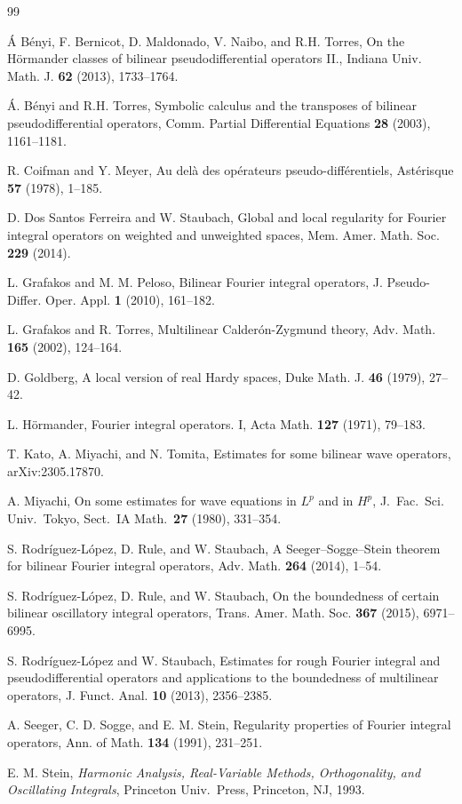 \documentclass[12pt]{amsart}
\numberwithin{equation}{section}
\theoremstyle{plain}
\theoremstyle{definition}
\begin{document}
\begin{thebibliography}{99}

\'A B\'enyi,  F. Bernicot, D. Maldonado, V. Naibo, and R.H. Torres,
On the H\"ormander classes of bilinear pseudodifferential operators II.,
Indiana Univ. Math. J. {\bf 62} (2013), 1733--1764.
	
\'A. B\'enyi and R.H. Torres,
Symbolic calculus and the transposes of bilinear pseudodifferential operators,
Comm. Partial Differential Equations {\bf 28} (2003), 1161--1181. 

R. Coifman and Y. Meyer,
{Au del\`a des op\'erateurs pseudo-diff\'erentiels},
Ast\'erisque {\bf 57} (1978), 1--185.

D. Dos Santos Ferreira and W. Staubach, 
{Global and local regularity for Fourier integral operators on
weighted and unweighted spaces}, 
Mem. Amer. Math. Soc. {\bf 229} (2014).

L. Grafakos and M. M. Peloso, 
Bilinear Fourier integral operators, 
J. Pseudo-Differ. Oper. Appl. {\bf 1} (2010), 161--182.

L. Grafakos and R. Torres,
{Multilinear Calder\'on-Zygmund theory},
Adv. Math. {\bf 165} (2002), 124--164.

D. Goldberg, 
A local version of real Hardy spaces, 
Duke Math. J. {\bf 46} (1979), 27--42.

L. H\"ormander, 
Fourier integral operators. I, 
Acta Math. {\bf 127} (1971), 79--183.

T. Kato, A. Miyachi, and N. Tomita,
Estimates for some bilinear wave operators,
arXiv:2305.17870.

A. Miyachi, 
On some estimates 
for wave equations in $L^p$ and in $H^p$, 
J.\ Fac.\ Sci. Univ.\ Tokyo, Sect.\ IA Math.\ {\bf 27} 
(1980), 331--354.

S. Rodr\'iguez-L\'opez, D. Rule, and W. Staubach,
A Seeger--Sogge--Stein theorem for bilinear Fourier 
integral operators, 
Adv. Math. {\bf 264} (2014), 1--54. 

S. Rodr\'iguez-L\'opez, D. Rule, and W. Staubach,
On the boundedness of certain bilinear oscillatory integral operators,
Trans. Amer. Math. Soc. {\bf 367} (2015), 6971--6995.

S. Rodr\'iguez-L\'opez and W. Staubach, 
Estimates for rough Fourier integral and pseudodifferential 
operators and applications to the boundedness of multilinear operators, 
J. Funct. Anal. {\bf 10} (2013), 2356--2385.

A. Seeger, C. D. Sogge, and E. M. Stein, 
Regularity properties of Fourier integral operators, 
Ann. of Math. {\bf 134} (1991), 231--251.

E. M. Stein, 
{\it Harmonic Analysis, 
Real-Variable Methods, 
Orthogonality, 
and Oscillating Integrals}, 
Princeton Univ.\ Press, 
Princeton, NJ, 1993.

\end{thebibliography}

\end{document}

